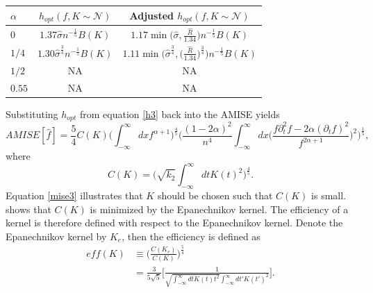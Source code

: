 \documentclass[
twoside,
openright,
titlepage,
numbers=noenddot,
headinclude,%
footinclude=true,
dottedtoc, %
ngerman,
american, %
pagesize=pdftex,
]{book}
\begin{document}
	\begin{center}
		\begin{tabular}{ l|| c| c|}
			$\alpha$ & $h_{opt}(f,K\sim \mathcal{N})$  & Adjusted $h_{opt}(f,K\sim \mathcal{N})$\\
			\hline
			$0$ & $1.37\hat{\sigma} n^{-\frac{1}{5}}B(K)$ & $1.17\min\big(\hat{\sigma},\frac{\hat{R}}{1.34}\big)n^{-\frac{1}{5}}B(K)$ \\
			$1/4$ & $1.30\hat{\sigma}^\frac{3}{4}n^{-\frac{1}{5}}B(K)$ & $1.11\min\big(\hat{\sigma}^\frac{3}{4},\big(\frac{\hat{R}}{1.34}\big)^\frac{3}{4}\big)n^{-\frac{1}{5}}B(K)$ \\
			$1/2$ & NA&  NA\\
			$0.55$ &  NA & NA \\
		\end{tabular}
		\captionsetup{width=0.95\textwidth}
		\label{t4}
	\end{center}
	Substituting $h_{opt}$ from equation \eqref{h3} back into the AMISE yields
	\begin{equation}
		AMISE[\hat{f}]= \frac{5}{4}C(K)\bigg(\int_{-\infty}^{\infty}dxf^{\alpha+1}\bigg)^\frac{4}{5}\bigg(\frac{(1-2\alpha)^2}{n^4}\int_{-\infty}^{\infty}dx\bigg(\frac{f\partial_t^2f-2\alpha(\partial_tf)^2}{f^{2\alpha+1}}\bigg)^2\bigg)^\frac{1}{5},
		\label{mise3}
	\end{equation}
	where
	\begin{equation}
		C(K)=\bigg(\sqrt{k_2}\int_{-\infty}^{\infty}dt K(t)^2\bigg)^{\frac{4}{5}}.
		\label{ck}
	\end{equation}
	Equation \eqref{mise3} illustrates that $K$ should be chosen such that $C(K)$ is small. \citet{Silverman86} shows that $C(K)$ is minimized by the Epanechnikov kernel. The efficiency of a kernel is therefore defined with respect to the Epanechnikov kernel. Denote the Epanechnikov kernel by $K_e$, then the efficiency is defined as
	\begin{equation}
		\begin{split}
			eff(K)&\equiv \bigg(\frac{C(K_e)}{C(K)}\bigg)^{\frac{5}{4}}\\
			&=\frac{3}{5\sqrt{5}}\bigg[\frac{1}{\sqrt{\int_{-\infty}^{\infty}dt K(t)t^2}\int_{-\infty}^{\infty}dt' K(t')^2}\bigg].
		\end{split}
	\end{equation}
\end{document}

